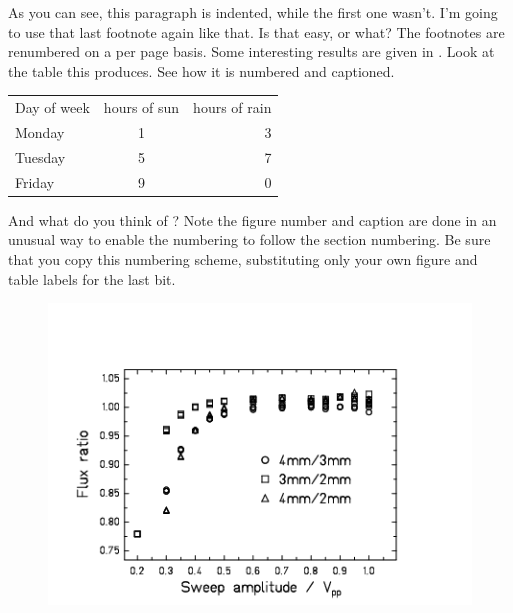 As you can see, this paragraph is indented, while the first one wasn't.
I'm going to use that last footnote again like that. Is that easy, or what? The footnotes are renumbered on a per page basis. Some interesting results are given in . Look at the table this produces. See how it is numbered and captioned.

\begin{table}[h]
\begin{center}
\begin{tabular}{lcr}
Day of week &  hours of sun & hours of rain \\
Monday &	1	& 3 \\
Tuesday & 5  & 7 \\
Friday & 9 & 0 \\
\end{tabular}

\label{mytable}  %

\end{center}
\end{table}

And what do you think of ?
Note the figure number and caption are done in an unusual way to enable the numbering to
follow the section numbering.  Be sure that you copy this numbering scheme, substituting only your
own figure and table labels for the last bit.

\begin{figure}[h]

\hfil  \includegraphics[width=.45\textwidth]{examplefig} \hfil 


\label{myFig1}  %

\end{figure}

